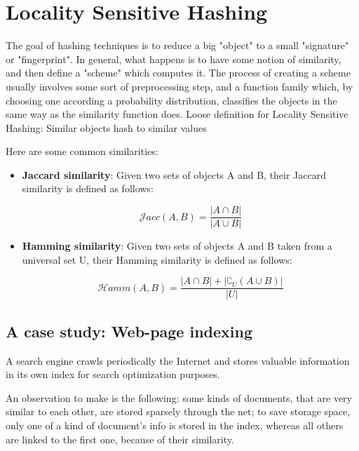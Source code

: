 \documentclass{report}
\newcommand{\jaccsim}{\mathcal{J}acc}
\newcommand{\hammsim}{\mathcal{H}amm}
\begin{document}
\chapter{Locality Sensitive Hashing}
	
	The goal of hashing techniques is to reduce a big "object" to a small "signature" or "fingerprint".	In general, what happens is to have some notion of similarity, and then define a "scheme" which computes it. The process of creating a scheme usually involves some sort of preprocessing step, and a function family which, by choosing one according a probability distribution, classifies the objects in the same way as the similarity function does.
	Loose definition for Locality Sensitive Hashing: Similar objects hash to similar values
	
	Here are some common similarities:
	\begin{itemize}
	
\item \textbf{Jaccard similarity}: Given two sets of objects A and B, their Jaccard similarity is defined as follows:
	
	\begin{equation}
	\jaccsim(A, B) = \frac{|A\cap B|}{|A\cup B|}
	\end{equation}
	
\item \textbf{Hamming similarity}: Given two sets of objects A and B taken from a universal set U, their Hamming similarity is defined as follows:
	
	\begin{equation}
	\hammsim(A, B) = \frac{|A\cap B| + |\complement_U(A\cup B)|}{|U|}
	\end{equation}
	
	\end{itemize}
	
\section{A case study: Web-page indexing}
	
	A search engine crawls periodically the Internet and stores valuable information in its own index for search optimization purposes.
	
	An observation to make is the following: some kinds of documents, that are very similar to each other, are stored sparsely through the net; to save storage space, only one of a kind of document's info is stored in the index, whereas all others are linked to the first one, because of their similarity.
	
\end{document}
